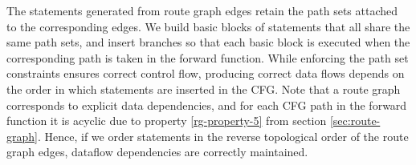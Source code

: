\documentclass[12pt]{gatech-thesis}
\begin{document}

The statements generated from route graph edges retain the path sets attached to the corresponding edges.
We build basic blocks of statements that all share the same path sets, and insert branches so that each basic block is executed when the corresponding path is taken in the forward function. 
While enforcing the path set constraints ensures correct control flow, producing correct data flows depends on the order in which statements are inserted in the CFG.
Note that a route graph corresponds to explicit data dependencies, and for each CFG path in the forward function it is acyclic due to property \ref{rg-property-5} from section \ref{sec:route-graph}. 
Hence, if we order statements in the reverse topological order of the route graph edges, dataflow dependencies are correctly maintained.
\end{document}
